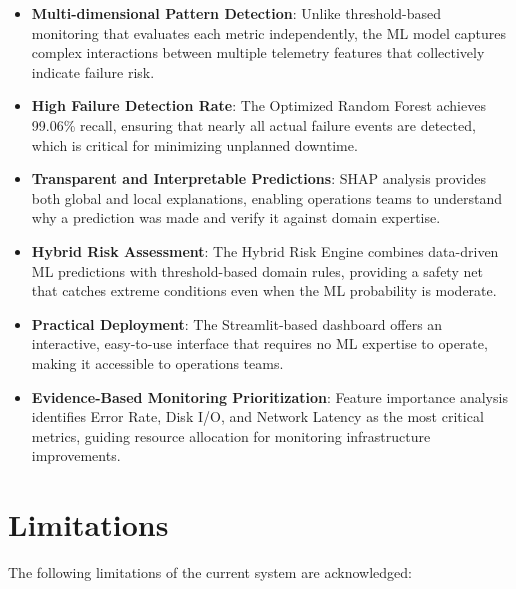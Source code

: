 \documentclass[12pt,letterpaper]{report}
\begin{document}
\begin{itemize}
  \item \textbf{Multi-dimensional Pattern Detection}: Unlike threshold-based monitoring that evaluates each metric independently, the ML model captures complex interactions between multiple telemetry features that collectively indicate failure risk.
  \item \textbf{High Failure Detection Rate}: The Optimized Random Forest achieves 99.06\% recall, ensuring that nearly all actual failure events are detected, which is critical for minimizing unplanned downtime.
  \item \textbf{Transparent and Interpretable Predictions}: SHAP analysis provides both global and local explanations, enabling operations teams to understand why a prediction was made and verify it against domain expertise.
  \item \textbf{Hybrid Risk Assessment}: The Hybrid Risk Engine combines data-driven ML predictions with threshold-based domain rules, providing a safety net that catches extreme conditions even when the ML probability is moderate.
  \item \textbf{Practical Deployment}: The Streamlit-based dashboard offers an interactive, easy-to-use interface that requires no ML expertise to operate, making it accessible to operations teams.
  \item \textbf{Evidence-Based Monitoring Prioritization}: Feature importance analysis identifies Error Rate, Disk I/O, and Network Latency as the most critical metrics, guiding resource allocation for monitoring infrastructure improvements.
\end{itemize}

\section{Limitations}

The following limitations of the current system are acknowledged:
\end{document}
